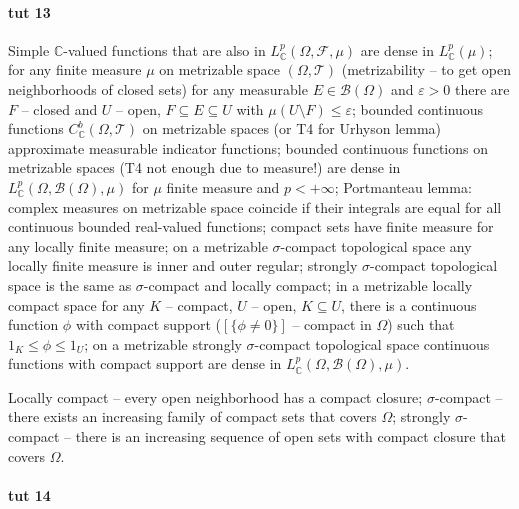 \documentclass[a4paper]{article}
\newcommand{\Fcal}{\mathcal{F}}
\newcommand{\Tcal}{\mathcal{T}}
\newcommand{\Bcal}{\mathcal{B}}
\newcommand{\cplx}{\mathbb{C}}
\begin{document}


\paragraph{tut 13} %
\label{par:tut_13}

Simple $\cplx$-valued functions that are also in $L^p_\cplx(\Omega, \Fcal, \mu)$ are dense in $L^p_\cplx(\mu)$;
for any finite measure $\mu$ on metrizable space $(\Omega, \Tcal)$ (metrizability -- to get open neighborhoods of closed sets) for any measurable $E \in \Bcal(\Omega)$ and $\varepsilon > 0$ there are $F$ -- closed and $U$ -- open, $F \subseteq E \subseteq U$ with $\mu(U \setminus F) \leq \varepsilon$;
bounded continuous functions $C_\cplx^b(\Omega, \Tcal)$ on metrizable spaces (or T4 for Urhyson lemma) approximate measurable indicator functions;
bounded continuous functions on metrizable spaces (T4 not enough due to measure!) are dense in $L^p_\cplx(\Omega, \Bcal(\Omega), \mu)$ for $\mu$ finite measure and $p < +\infty$;
Portmanteau lemma: complex measures on metrizable space coincide if their integrals are equal for all continuous bounded real-valued functions;
compact sets have finite measure for any locally finite measure;
on a metrizable $\sigma$-compact topological space any locally finite measure is inner and outer regular;
strongly $\sigma$-compact topological space is the same as $\sigma$-compact and locally compact;
in a metrizable locally compact space for any $K$ -- compact, $U$ -- open, $K \subseteq U$, there is a continuous function $\phi$ with compact support ($[\{\phi \neq 0\}]$ -- compact in $\Omega$) such that $1_K \leq \phi \leq 1_U$;
on a metrizable strongly $\sigma$-compact topological space continuous functions with compact support are dense in $L^p_\cplx(\Omega, \Bcal(\Omega), \mu)$.

Locally compact -- every open neighborhood has a compact closure;
$\sigma$-compact -- there exists an increasing family of compact sets that covers $\Omega$;
strongly $\sigma$-compact -- there is an increasing sequence of open sets with compact closure that covers $\Omega$.



\paragraph{tut 14} %
\label{par:tut_14}
\end{document}
